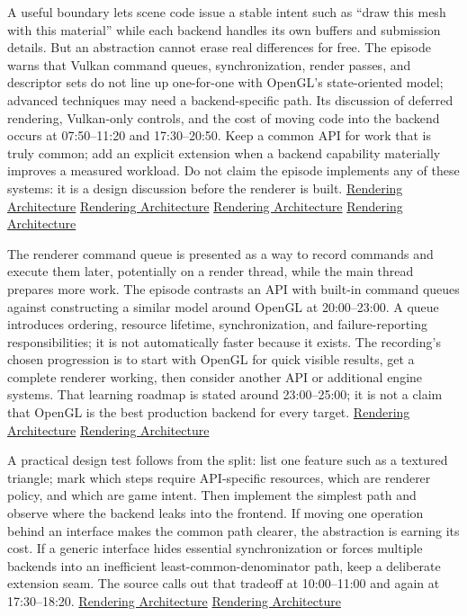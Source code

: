 A useful boundary lets scene code issue a stable intent such as ``draw this mesh with this material'' while each backend handles its own buffers and submission details. But an abstraction cannot erase real differences for free. The episode warns that Vulkan command queues, synchronization, render passes, and descriptor sets do not line up one-for-one with OpenGL's state-oriented model; advanced techniques may need a backend-specific path. Its discussion of deferred rendering, Vulkan-only controls, and the cost of moving code into the backend occurs at 07:50--11:20 and 17:30--20:50. Keep a common API for work that is truly common; add an explicit extension when a backend capability materially improves a measured workload. Do not claim the episode implements any of these systems: it is a design discussion before the renderer is built. \href{https://www.youtube.com/watch?v=YPWNNmlIUIo&t=470s}{Rendering Architecture} \href{https://www.youtube.com/watch?v=YPWNNmlIUIo&t=630s}{Rendering Architecture} \href{https://www.youtube.com/watch?v=YPWNNmlIUIo&t=1050s}{Rendering Architecture} \href{https://www.youtube.com/watch?v=YPWNNmlIUIo&t=1220s}{Rendering Architecture}

The renderer command queue is presented as a way to record commands and execute them later, potentially on a render thread, while the main thread prepares more work. The episode contrasts an API with built-in command queues against constructing a similar model around OpenGL at 20:00--23:00. A queue introduces ordering, resource lifetime, synchronization, and failure-reporting responsibilities; it is not automatically faster because it exists. The recording's chosen progression is to start with OpenGL for quick visible results, get a complete renderer working, then consider another API or additional engine systems. That learning roadmap is stated around 23:00--25:00; it is not a claim that OpenGL is the best production backend for every target. \href{https://www.youtube.com/watch?v=YPWNNmlIUIo&t=1200s}{Rendering Architecture} \href{https://www.youtube.com/watch?v=YPWNNmlIUIo&t=1380s}{Rendering Architecture}

A practical design test follows from the split: list one feature such as a textured triangle; mark which steps require API-specific resources, which are renderer policy, and which are game intent. Then implement the simplest path and observe where the backend leaks into the frontend. If moving one operation behind an interface makes the common path clearer, the abstraction is earning its cost. If a generic interface hides essential synchronization or forces multiple backends into an inefficient least-common-denominator path, keep a deliberate extension seam. The source calls out that tradeoff at 10:00--11:00 and again at 17:30--18:20. \href{https://www.youtube.com/watch?v=YPWNNmlIUIo&t=600s}{Rendering Architecture} \href{https://www.youtube.com/watch?v=YPWNNmlIUIo&t=1050s}{Rendering Architecture}

